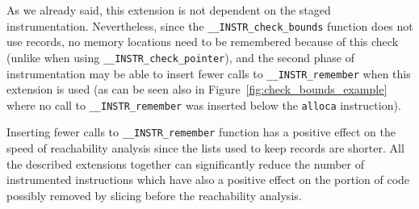 As we already said, this extension is not dependent on the staged
instrumentation. Nevertheless, since the \texttt{\_\_INSTR\_check\_bounds}
function does not use records, no memory locations need to be remembered
because of this check (unlike when using \texttt{\_\_INSTR\_check\_pointer}),
and the second phase of instrumentation may be able to insert fewer calls to
\texttt{\_\_INSTR\_remember} when this extension is used (as can be seen also
in Figure~\ref{fig:check_bounds_example} where no call to
\texttt{\_\_INSTR\_remember} was inserted below the \texttt{alloca}
instruction).

\medskip
Inserting fewer calls to \texttt{\_\_INSTR\_remember} function has
a positive effect on the speed of reachability analysis since the lists
used to keep records are shorter. All the described extensions together
can significantly reduce the number of instrumented instructions
which have also a positive effect on the portion of code possibly
removed by slicing before the reachability analysis.




